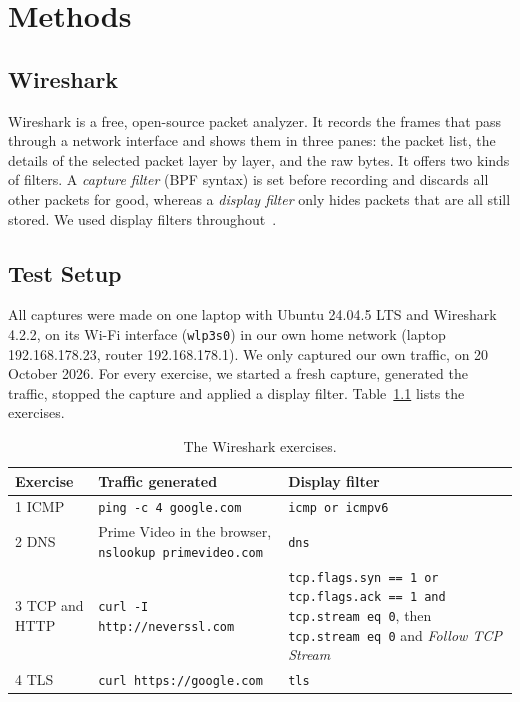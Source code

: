 \chapter{Methods}\label{chap:methods}

\section{Wireshark}

Wireshark is a free, open-source packet analyzer. It records the frames that pass through a network interface and shows them in three panes: the packet list, the details of the selected packet layer by layer, and the raw bytes. It offers two kinds of filters. A \emph{capture filter} (BPF syntax) is set before recording and discards all other packets for good, whereas a \emph{display filter} only hides packets that are all still stored. We used display filters throughout~\cite{wireshark_guide}.

\section{Test Setup}

All captures were made on one laptop with Ubuntu 24.04.5 LTS and Wireshark 4.2.2, on its Wi-Fi interface (\texttt{wlp3s0}) in our own home network (laptop 192.168.178.23, router 192.168.178.1). We only captured our own traffic, on 20 October 2026. For every exercise, we started a fresh capture, generated the traffic, stopped the capture and applied a display filter. Table~\ref{tab:exercises} lists the exercises.

\begin{table}[ht]
	\centering
	\small
	\begin{tabularx}{\textwidth}{@{}lXX@{}}
		\toprule
		Exercise & Traffic generated & Display filter \\
		\midrule
		1 ICMP & \texttt{ping -c 4 google.com} & \texttt{icmp or icmpv6} \\
		2 DNS & Prime Video in the browser, \texttt{nslookup primevideo.com} & \texttt{dns} \\
		3 TCP and HTTP & \texttt{curl -I http://neverssl.com} & \texttt{tcp.flags.syn == 1 or tcp.flags.ack == 1 and tcp.stream eq 0}, then \texttt{tcp.stream eq 0} and \emph{Follow TCP Stream} \\
		4 TLS & \texttt{curl https://google.com} & \texttt{tls} \\
		\bottomrule
	\end{tabularx}
	\caption{The Wireshark exercises.}
	\label{tab:exercises}
\end{table}

